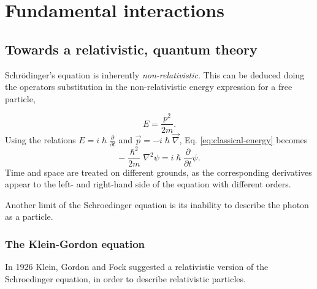 \chapter{Fundamental interactions}
\label{chap:fundInteractions}
\section{Towards a relativistic, quantum theory}
Schr\"odinger's equation is inherently \textit{non-relativistic}. This can be deduced doing the operators substitution in the non-relativistic energy expression for a free particle,

    \begin{equation}
        E = \frac{p^2}{2m}.
        \label{eq:classical-energy}
    \end{equation}
    Using the relations $E = i\hslash\frac{\partial}{\partial t}$ and $\Vec{p} = -i\hslash\Vec{\nabla}$, Eq. \ref{eq:classical-energy} becomes
    \begin{equation}
        -\frac{\hslash^2}{2m}\nabla^2\psi = i\hslash\frac{\partial}{\partial t}\psi.
        \label{eq:schroedinger1}
    \end{equation}
Time and space are treated on different grounds, as the corresponding derivatives appear to the left- and right-hand side of the equation with different orders.

Another limit of the Schroedinger equation is its inability to describe the photon as a particle.

\subsection{The Klein-Gordon equation}
\label{sec:KG-equation}
In 1926 Klein, Gordon and Fock suggested a relativistic version of the Schroedinger equation, in order to describe relativistic particles.


